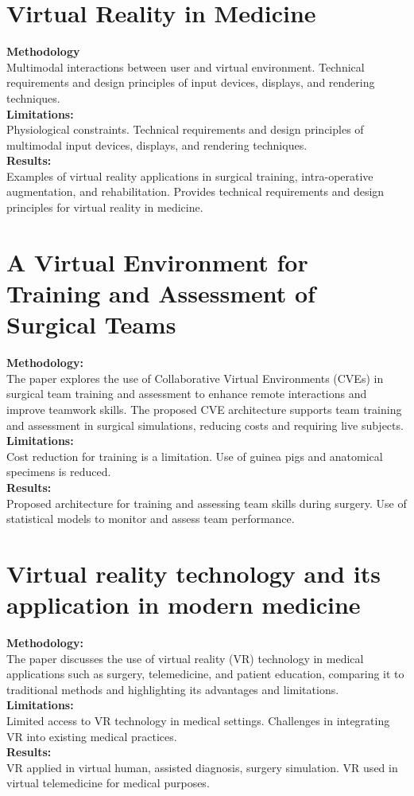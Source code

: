 \section{Virtual Reality in Medicine
	\cite{JournalArticle}\cite{JournalArticle11}}
\textbf{Methodology}\\Multimodal interactions between user and virtual environment.
Technical requirements and design principles of input devices, displays, and rendering techniques.\\
\textbf{Limitations:}\\Physiological constraints. Technical requirements and design principles of multimodal input devices, displays, and rendering techniques.\\
\textbf{Results:}\\ Examples of virtual reality applications in surgical training, intra-operative augmentation, and rehabilitation. Provides technical requirements and design principles for virtual reality in medicine.
\section{A Virtual Environment for Training and Assessment of Surgical Teams
	\cite{papagiannakis2018virtual}}
\textbf{Methodology:}\\The paper explores the use of Collaborative Virtual Environments (CVEs) in surgical team training and assessment to enhance remote interactions and improve teamwork skills. The proposed CVE architecture supports team training and assessment in surgical simulations, reducing costs and requiring live subjects.\\
\textbf{Limitations:}\\Cost reduction for training is a limitation.
Use of guinea pigs and anatomical specimens is reduced.\\
\textbf{Results:}\\Proposed architecture for training and assessing team skills during surgery. Use of statistical models to monitor and assess team performance.
\section{Virtual reality technology and its application in modern medicine
	\cite{JournalArticle}}
\textbf{Methodology:}\\The paper discusses the use of virtual reality (VR) technology in medical applications such as surgery, telemedicine, and patient education, comparing it to traditional methods and highlighting its advantages and limitations.\\
\textbf{Limitations:}\\Limited access to VR technology in medical settings. Challenges in integrating VR into existing medical practices.\\
\textbf{Results:}\\ VR applied in virtual human, assisted diagnosis, surgery simulation. VR used in virtual telemedicine for medical purposes.
